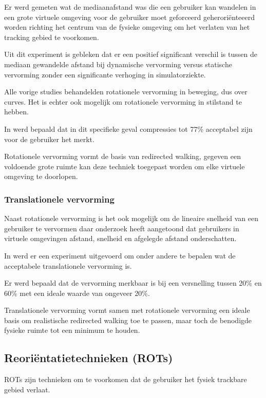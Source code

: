 \documentclass[a4paper,12pt]{article}
\begin{document}
Er werd gemeten wat de mediaanafstand was die een gebruiker kan wandelen in een
grote virtuele omgeving voor de gebruiker moet geforceerd geherori\"enteeerd
worden richting het centrum van de fysieke omgeving om het verlaten van het
tracking gebied te voorkomen.

Uit dit experiment is gebleken dat er een positief significant verschil is tussen
de mediaan gewandelde afstand bij dynamische vervorming versus statische
vervorming zonder een significante verhoging in simulatorziekte.

Alle vorige studies behandelden rotationele vervorming in beweging, dus over 
curves. Het is echter ook mogelijk om rotationele vervorming in stilstand te
hebben.

In\cite{steinicke09} werd bepaald dat in dit specifieke geval compressies tot
77\% acceptabel zijn voor de gebruiker het merkt.

Rotationele vervorming vormt de basis van redirected walking, gegeven een
voldoende grote ruimte kan deze techniek toegepast worden om elke virtuele
omgeving te doorlopen.


\subsubsection{Translationele vervorming}
Naast rotationele vervorming is het ook mogelijk om de lineaire snelheid van een
gebruiker te vervormen daar onderzoek heeft aangetoond dat gebruikers in virtuele
omgevingen afstand\cite{loomis03}, snelheid\cite{banton05} en afgelegde afstand
\cite{frenz07} onderschatten.

In\cite{steinicke09} werd er een experiment uitgevoerd om onder andere te bepalen
wat de acceptabele translationele vervorming is.

Er werd bepaald dat de vervorming merkbaar is bij een versnelling tussen 20\% en
60\% met een ideale waarde van ongeveer 20\%.

Translationele vervorming vormt samen met rotationele vervorming een ideale basis 
om realistische redirected walking toe te passen, maar toch de benodigde fysieke 
ruimte tot een minimum te houden.


\subsection{Reori\"entatietechnieken (ROTs)}
ROTs zijn technieken om te voorkomen dat de gebruiker het fysiek trackbare gebied
verlaat.
\end{document}

